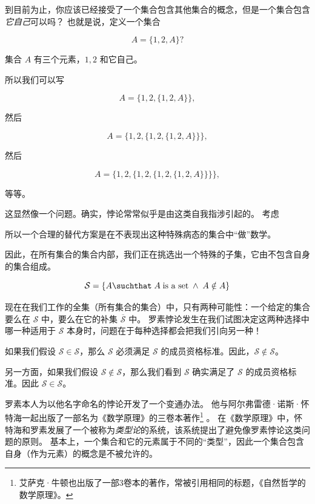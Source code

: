 到目前为止，你应该已经接受了一个集合包含其他集合的概念，但是一个集合包含\emph{它自己}可以吗？
也就是说，定义一个集合

\[ A = \{ 1, 2, A \}?
\]

\noindent 集合 $A$ 有三个元素，$1, 2$ 和它自己。

所以我们可以写

\[ A = \{ 1, 2, \{ 1, 2, A \} \}, \]
 
\noindent 然后

\[ A = \{ 1, 2, \{ 1, 2, \{ 1, 2, A \} \} \}, \]

\noindent 然后

\[ A = \{ 1, 2, \{ 1, 2, \{ 1, 2, \{ 1, 2, A \} \} \} \}, \]
  
\noindent 等等。

这显然像一个问题。确实，悖论常常似乎是由这类自我指涉引起的。
考虑

\begin{center} 
\end{center}

所以一个合理的替代方案是在不表现出这种特殊病态的集合中“做”数学。

因此，在所有集合的集合内部，我们正在挑选出一个特殊的子集，它由不包含自身的集合组成。

\[ {\mathcal S} = \{ A \suchthat \; A \; \mbox{is a set} \; \land \; A \notin A \} \]

现在在我们工作的全集（所有集合的集合）中，只有两种可能性：一个给定的集合要么在 ${\mathcal S}$ 中，要么在它的补集 $\overline{\mathcal S}$ 中。
罗素悖论发生在我们试图决定这两种选择中哪一种适用于 ${\mathcal S}$ 本身时，问题在于每种选择都会把我们引向另一种！

如果我们假设 ${\mathcal S} \in {\mathcal S}$，那么 ${\mathcal S}$ 必须满足 ${\mathcal S}$ 的成员资格标准。因此，${\mathcal S} \notin {\mathcal S}$。

另一方面，如果我们假设 ${\mathcal S} \notin {\mathcal S}$，那么我们看到 ${\mathcal S}$ 确实满足了 ${\mathcal S}$ 的成员资格标准。因此 ${\mathcal S} \in {\mathcal S}$。

罗素本人为以他名字命名的悖论开发了一个变通办法。
他与阿尔弗雷德·诺斯·怀特海一起出版了一部名为《数学原理》的三卷本著作\footnote{艾萨克·牛顿也出版了一部3卷本的著作，常被引用相同的标题，《自然哲学的数学原理》。} \cite{PM}。
在《数学原理》中，怀特海和罗素发展了一个被称为\emph{类型论}的系统，该系统提出了避免像罗素悖论这类问题的原则。
基本上，一个集合和它的元素属于不同的“类型”，因此一个集合包含自身（作为元素）的概念是不被允许的。
\clearpage 




%
%
%

